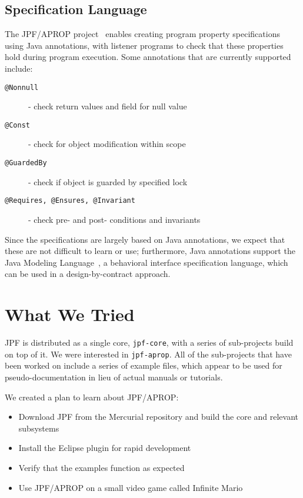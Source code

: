 \documentclass[twocolumn]{article}
\begin{document}
\subsection{Specification Language}

The JPF/APROP project~\cite{aprop} enables creating program property specifications using Java annotations, with listener programs to check that these properties hold during program execution. 
Some annotations that are currently supported include:

\begin{description}
\item[\texttt{@Nonnull}] - check 	return values and field for null value
\item[\texttt{@Const}] - check for object modification within scope
\item[\texttt{@GuardedBy}] - check if object is guarded by specified lock
\item[\texttt{@Requires, @Ensures, @Invariant}] - check pre- and post- conditions and invariants
\end{description}

Since the specifications are largely based on Java annotations, we expect that these are not difficult to learn or use; 
furthermore, Java annotations support the Java Modeling Language~\cite{DBLP:journals/sttt/BurdyCCEKLLP05}, a behavioral interface specification language, which can be used in a design-by-contract approach. 

\section{What We Tried}
JPF is distributed as a single core, \texttt{jpf-core}, with a series of sub-projects build on top of it. We were interested in \texttt{jpf-aprop}. All of the sub-projects that have been worked on include a series of example files, which appear to be used for pseudo-documentation in lieu of actual manuals or tutorials.

We created a plan to learn about JPF/APROP:
\begin{itemize}
	\item Download JPF from the Mercurial repository and build the core and relevant subsystems
	\item Install the Eclipse plugin for rapid development
	\item Verify that the examples function as expected
	\item Use JPF/APROP on a small video game called Infinite Mario
\end{itemize}
\end{document}
